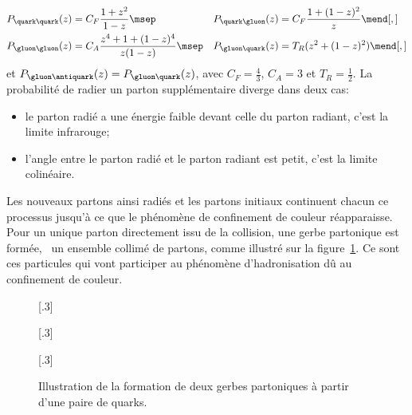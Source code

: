 \begin{align}
P_{\quark\quark}(z) &= C_F \frac{1+z^2}{1-z} \msep&
P_{\quark\gluon}(z) &= C_F \frac{1+(1-z)^2}{z} \mend[,]
\\
P_{\gluon\gluon}(z) &= C_A \frac{z^4 + 1 + (1-z)^4}{z(1-z)} \msep&
P_{\gluon\quark}(z) &= T_R (z^2+(1-z)^2) \mend[,]
\end{align}
et $P_{\gluon\antiquark}(z) = P_{\gluon\quark}(z)$,
avec
$C_F=\frac{4}{3}$,
$C_A = 3$ et
$T_R=\frac{1}{2}$.
La probabilité de radier un parton supplémentaire diverge dans deux cas:
\begin{itemize}
\item le parton radié a une énergie faible devant celle du parton radiant, c'est la limite infrarouge;
\item l'angle entre le parton radié et le parton radiant est petit, c'est la limite colinéaire.
\end{itemize}
\par Les nouveaux partons ainsi radiés et les partons initiaux continuent chacun ce processus jusqu'à ce que le phénomène de confinement de couleur réapparaisse. Pour un unique parton directement issu de la collision, une gerbe partonique est formée, \ie\ un ensemble collimé de partons, comme illustré sur la figure~\ref{fig-parton_shower}.
Ce sont ces particules qui vont participer au phénomène d'hadronisation dû au confinement de couleur.
\begin{figure}[h]
\centering
{}[.3\textwidth]
{\begin{tikzpicture}

\end{tikzpicture}}
\hfill
{}[.3\textwidth]
{\begin{tikzpicture}


\end{tikzpicture}}
\hfill
{}[.3\textwidth]
{\begin{tikzpicture}



\end{tikzpicture}}

\caption[Formation de deux gerbes partoniques.]{Illustration de la formation de deux gerbes partoniques à partir d'une paire de quarks.}
\label{fig-parton_shower}
\end{figure}

